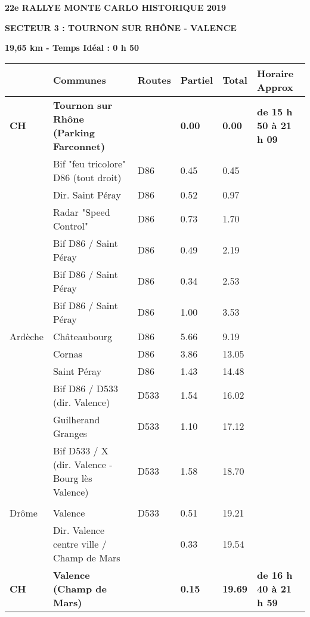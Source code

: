 \documentclass{article}%
\begin{document}
%
\normalsize%
\begin{center} \textbf{\LARGE{22e RALLYE MONTE CARLO HISTORIQUE 2019}} \end{center}%
\begin{flushleft} \textbf{SECTEUR 3 : TOURNON SUR RHÔNE - VALENCE
} \end{flushleft}%
\begin{flushright}           \end{flushright}%
\begin{flushright} \textbf{19,65 km - Temps Idéal : 0 h 50} \end{flushright}%
\begin{longtable}{p{2.25cm}|p{6.7cm}|p{2.0cm}|p{1.5cm}|p{1.5cm}|p{3.5cm}}%
\hline%
&Communes&Routes&Partiel&Total&Horaire Approx\\%
\hline%
\endhead%
\endfoot%
\endlastfoot%
\textbf{﻿CH}&\textbf{Tournon sur Rhône (Parking Farconnet)}& &\textbf{0.00}&\textbf{0.00}&\textbf{de 15 h 50 à 21 h 09}\\%
 &Bif "feu tricolore"  D86 (tout droit)&D86&0.45&0.45& \\%
 &Dir. Saint Péray&D86&0.52&0.97& \\%
 &Radar "Speed Control"&D86&0.73&1.70& \\%
 &Bif D86 / Saint Péray&D86&0.49&2.19& \\%
 &Bif D86 / Saint Péray&D86&0.34&2.53& \\%
 &Bif D86 / Saint Péray&D86&1.00&3.53& \\%
Ardèche &Châteaubourg&D86&5.66&9.19& \\%
 &Cornas&D86&3.86&13.05& \\%
 &Saint Péray&D86&1.43&14.48& \\%
 &Bif D86 / D533 (dir. Valence)&D533&1.54&16.02& \\%
 &Guilherand  Granges&D533&1.10&17.12& \\%
 &Bif D533 / X (dir. Valence - Bourg lès Valence)&D533&1.58&18.70& \\%
\hline& & & & & \\%
Drôme&Valence&D533&0.51&19.21& \\%
 &Dir. Valence centre ville / Champ de Mars& &0.33&19.54& \\%
\textbf{CH}&\textbf{Valence (Champ de Mars)}& &\textbf{0.15}&\textbf{19.69}&\textbf{de 16 h 40 à 21 h 59}\\%
\hline%
\end{longtable}%
\begin{flushleft} \textit{} \end{flushleft}%
\begin{center} \textit{\textbf{}} \end{center}%
\begin{center} \textit{} \end{center}%
\begin{center} \textit{} \end{center}%
\end{document}
